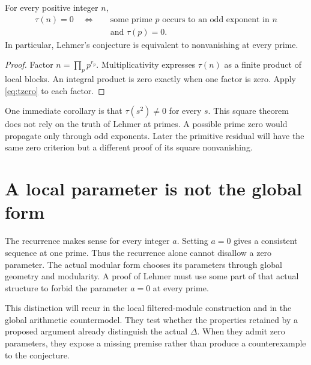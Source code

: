 \begin{theorem}\label{thm:primereduction}
For every positive integer $n$,
\[
\begin{aligned}
\tau(n)=0\quad\Longleftrightarrow\quad &
\text{some prime }p\text{ occurs to an odd exponent in }n\\
&\text{and }\tau(p)=0.
\end{aligned}
\]
In particular, Lehmer's conjecture is equivalent to nonvanishing at every prime.
\end{theorem}
\begin{proof}
Factor $n=\prod_p p^{r_p}$. Multiplicativity expresses $\tau(n)$ as a finite product of local blocks. An integral product is zero exactly when one factor is zero. Apply \eqref{eq:tzero} to each factor.
\end{proof}

One immediate corollary is that $\tau(s^2)\ne0$ for every $s$. This square theorem does not rely on the truth of Lehmer at primes. A possible prime zero would propagate only through odd exponents. Later the primitive residual will have the same zero criterion but a different proof of its square nonvanishing.


\section{A local parameter is not the global form}
The recurrence makes sense for every integer $a$. Setting $a=0$ gives a consistent sequence at one prime. Thus the recurrence alone cannot disallow a zero parameter. The actual modular form chooses its parameters through global geometry and modularity. A proof of Lehmer must use some part of that actual structure to forbid the parameter $a=0$ at every prime.

This distinction will recur in the local filtered-module construction and in the global arithmetic countermodel. They test whether the properties retained by a proposed argument already distinguish the actual $\Delta$. When they admit zero parameters, they expose a missing premise rather than produce a counterexample to the conjecture.
